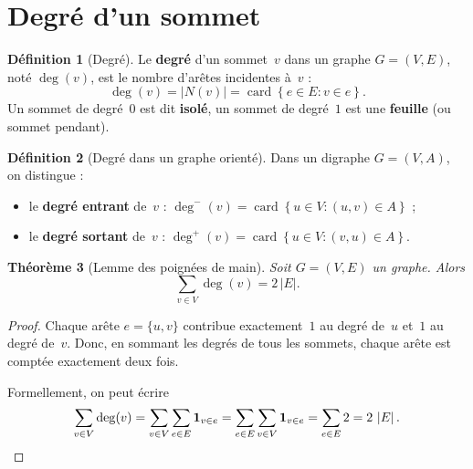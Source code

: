 \documentclass[12pt,a4paper,openany]{book}
\theoremstyle{definition}
\newtheorem{definition}{Définition}[chapter]
\theoremstyle{plain}
\newtheorem{theoreme}[definition]{Théorème}
\theoremstyle{remark}
\newcommand{\abs}[1]{\left|#1\right|}
\newcommand{\set}[1]{\left\{#1\right\}}
\DeclareMathOperator{\card}{card}
\begin{document}
\section{Degré d'un sommet}
\label{sec:degre}

\begin{definition}[Degré]
\label{def:degre}
Le \textbf{degré} d'un sommet~$v$ dans un graphe $G = (V, E)$, noté
$\deg(v)$, est le nombre d'arêtes incidentes à~$v$ :
\[
  \deg(v) = \abs{N(v)} = \card\set{e \in E : v \in e}.
\]
Un sommet de degré~$0$ est dit \textbf{isolé},
un sommet de degré~$1$ est une \textbf{feuille} (ou sommet pendant).
\end{definition}

\begin{definition}[Degré dans un graphe orienté]
\label{def:degre-oriente}
Dans un digraphe $G = (V, A)$, on distingue :
\begin{itemize}
  \item le \textbf{degré entrant} de~$v$ :
    $\deg^-(v) = \card\set{u \in V : (u,v) \in A}$ ;
  \item le \textbf{degré sortant} de~$v$ :
    $\deg^+(v) = \card\set{u \in V : (v,u) \in A}$.
\end{itemize}
\end{definition}

\begin{theoreme}[Lemme des poignées de main]
\label{thm:handshaking}
Soit $G = (V, E)$ un graphe. Alors
\[
  \sum_{v \in V} \deg(v) = 2\, \abs{E}.
\]
\end{theoreme}

\begin{proof}
Chaque arête $e = \{u, v\}$ contribue exactement~$1$ au degré de~$u$ et~$1$ au
degré de~$v$. Donc, en sommant les degrés de tous les sommets, chaque arête est
comptée exactement deux fois.

Formellement, on peut écrire
\[
  \sum_{v \in V} \deg(v) = \sum_{v \in V} \sum_{e \in E} \mathbf{1}_{v \in e}
  = \sum_{e \in E} \sum_{v \in V} \mathbf{1}_{v \in e}
  = \sum_{e \in E} 2 = 2\, \abs{E}. \qedhere
\]
\end{proof}
\end{document}
